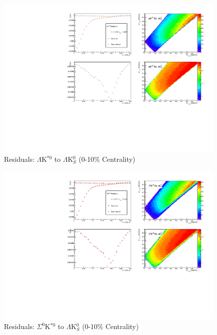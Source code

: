 \documentclass[../AnalysisNoteJBuxton.tex]{subfiles}
\begin{document}
\begin{figure}[h]
  \centering
  \includegraphics[width=\textwidth]{9_AdditionalFigures/Figures/Residuals/LamK0/Residuals_LamK0_0010_LamKSt0ToLamK0_MomResCrctn_NonFlatBgdCrctn_SingleLamParam_ResidualsIncluded_UsingCoulombOnlyInterpCfs.pdf}
  \caption[Residuals: $\Lambda$K$^{*0}$ to $\Lambda$K$^{0}_{S}$ (0-10\% Centrality)]{Residuals: $\Lambda$K$^{*0}$ to $\Lambda$K$^{0}_{S}$ (0-10\% Centrality)}
  \label{fig:Res_LamK0_0010_LamKSt0}
\end{figure}


\begin{figure}[h]
  \centering
  \includegraphics[width=\textwidth]{9_AdditionalFigures/Figures/Residuals/LamK0/Residuals_LamK0_0010_Sig0KSt0ToLamK0_MomResCrctn_NonFlatBgdCrctn_SingleLamParam_ResidualsIncluded_UsingCoulombOnlyInterpCfs.pdf}
  \caption[Residuals: $\Sigma^{0}$K$^{*0}$ to $\Lambda$K$^{0}_{S}$ (0-10\% Centrality)]{Residuals: $\Sigma^{0}$K$^{*0}$ to $\Lambda$K$^{0}_{S}$ (0-10\% Centrality)}
  \label{fig:Res_LamK0_0010_Sig0KSt0}
\end{figure}
\end{document}
